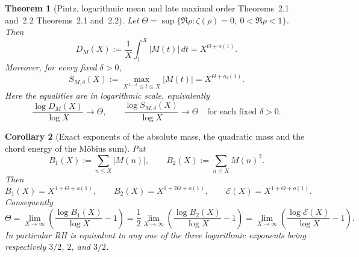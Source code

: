 \documentclass[11pt,reqno]{amsart}
\makeatletter
\let\CG@origcite\cite
\renewcommand*{\cite}[2][]{\def\CG@citekey{#2}%
  \ifx\relax#1\relax\CG@origcite{#2}\else\CG@origcite[#1]{#2}\fi}
\numberwithin{equation}{section}
\theoremstyle{plain}
\newtheorem{theorem}{Theorem}[section]
\newtheorem{corollary}[theorem]{Corollary}
\theoremstyle{definition}
\theoremstyle{remark}
\newcommand{\En}{\mathcal{E}}
\makeatother
\begin{document}
\begin{theorem}[Pintz, logarithmic mean and late maximal order
{\cite[Theorems~2.1 and~2.2]{Pintz2026}}]
\label{thm:pintz-2026}
Let $\Theta=\sup\{\Re\rho:\zeta(\rho)=0,\ 0<\Re\rho<1\}$.  Then
\begin{equation}
 D_M(X):=\frac1X\int_1^X|M(t)|\,dt=X^{\Theta+o(1)}.
\end{equation}
Moreover, for every fixed $\delta>0$,
\begin{equation}
 S_{M,\delta}(X):=\max_{X^{1-\delta}\le t\le X}|M(t)|
 =X^{\Theta+o_\delta(1)}.
\end{equation}
Here the equalities are in logarithmic scale, equivalently
\begin{equation}
 \frac{\log D_M(X)}{\log X}\to\Theta,
 \qquad
 \frac{\log S_{M,\delta}(X)}{\log X}\to\Theta
 \quad\text{for each fixed }\delta>0.
\end{equation}
\end{theorem}

\begin{corollary}[Exact exponents of the absolute mass, the quadratic mass and the chord energy of the Möbius sum]
\label{cor:pintz-excursion-exponents}
Put
\begin{equation}
 B_1(X):=\sum_{n\le X}|M(n)|,
 \qquad
 B_2(X):=\sum_{n\le X}M(n)^2.
\end{equation}
Then
\begin{equation}
\label{eq:pintz-B1-B2}
 B_1(X)=X^{1+\Theta+o(1)},
 \qquad
 B_2(X)=X^{1+2\Theta+o(1)},
 \qquad
 \En(X)=X^{1+\Theta+o(1)}.
\end{equation}
Consequently
\begin{equation}
\label{eq:Theta-from-excursions}
 \Theta=\lim_{X\to\infty}\left(\frac{\log B_1(X)}{\log X}-1\right)
 =\frac12\lim_{X\to\infty}
 \left(\frac{\log B_2(X)}{\log X}-1\right)
 =\lim_{X\to\infty}\left(\frac{\log\En(X)}{\log X}-1\right).
\end{equation}
In particular RH is equivalent to any one of the three logarithmic exponents
being respectively $3/2$, $2$, and $3/2$.
\end{corollary}
\end{document}
